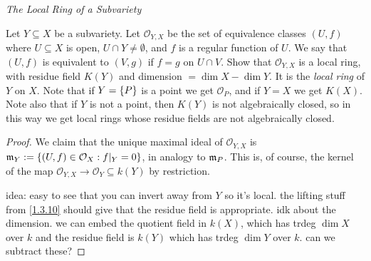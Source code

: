 \label{1.3.13}

\emph{The Local Ring of a Subvariety}

Let $Y \subseteq X$ be a subvariety. Let $\mathcal O_{Y, X}$ be the set of equivalence classes $(U, f)$ where $U \subseteq X$ is open, $U \cap Y \neq \emptyset$, and $f$ is a regular function of $U$. We say that $(U, f)$ is equivalent to $(V, g)$ if $f = g$ on $U \cap V$. Show that $\mathcal O_{Y, X}$ is a local ring, with residue field $K(Y)$ and dimension $= \dim X - \dim Y$. It is the \emph{local ring} of $Y$ on $X$. Note that if $Y = {\left\{P\right\}}$ is a point we get $\mathcal O_P$, and if $Y = X$ we get $K(X)$. Note also that if $Y$ is not a point, then $K(Y)$ is not algebraically closed, so in this way we get local rings whose residue fields are not algebraically closed.

\begin{proof}
    We claim that the unique maximal ideal of $\mathcal O_{Y, X}$ is $\mathfrak m_{Y} := {\left\{(U, f) \in \mathcal O_X : f|_{Y} = 0\right\}}$, in analogy to $\mathfrak m_P$. This is, of course, the kernel of the map $\mathcal O_{Y, X} \longrightarrow \mathcal O_Y \subseteq k(Y)$ by restriction.

    idea: easy to see that you can invert away from $Y$ so it's local. the lifting stuff from \ref{1.3.10} should give that the residue field is appropriate. idk about the dimension. we can embed the quotient field in $k(X)$, which has trdeg $\dim X$ over $k$ and the residue field is $k(Y)$ which has trdeg $\dim Y$ over $k$. can we subtract these?
\end{proof}
